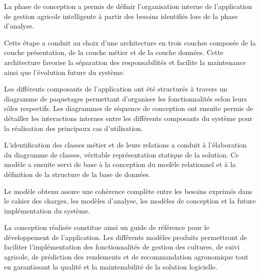 La phase de conception a permis de définir l'organisation interne de
l'application de gestion agricole intelligente à partir des besoins
identifiés lors de la phase d'analyse.

Cette étape a conduit au choix d'une architecture en trois couches
composée de la couche présentation, de la couche métier et de la couche
données. Cette architecture favorise la séparation des responsabilités
et facilite la maintenance ainsi que l'évolution future du système.

Les différents composants de l'application ont été structurés à travers
un diagramme de paquetages permettant d'organiser les fonctionnalités
selon leurs rôles respectifs. Les diagrammes de séquence de conception
ont ensuite permis de détailler les interactions internes entre les
différents composants du système pour la réalisation des principaux cas
d'utilisation.

L'identification des classes métier et de leurs relations a conduit à
l'élaboration du diagramme de classes, véritable représentation statique
de la solution. Ce modèle a ensuite servi de base à la conception du
modèle relationnel et à la définition de la structure de la base de
données.

Le modèle obtenu assure une cohérence complète entre les besoins
exprimés dans le cahier des charges, les modèles d'analyse, les modèles
de conception et la future implémentation du système.

La conception réalisée constitue ainsi un guide de référence pour le
développement de l'application. Les différents modèles produits
permettront de faciliter l'implémentation des fonctionnalités de gestion
des cultures, de suivi agricole, de prédiction des rendements et de
recommandation agronomique tout en garantissant la qualité et la
maintenabilité de la solution logicielle.
